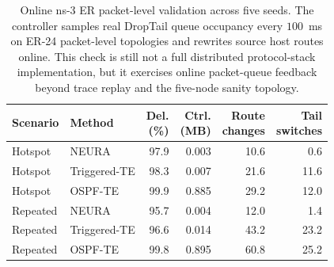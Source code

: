 \begin{table}[t]
\centering
\scriptsize
\caption{Online ns-3 ER packet-level validation across five seeds. The controller samples real DropTail queue occupancy every $100$~ms on ER-24 packet-level topologies and rewrites source host routes online. This check is still not a full distributed protocol-stack implementation, but it exercises online packet-queue feedback beyond trace replay and the five-node sanity topology.}
\label{tab:ns3-online-er}
\setlength{\tabcolsep}{3.5pt}
\renewcommand{\arraystretch}{1.05}
\begin{tabular*}{\columnwidth}{@{\extracolsep{\fill}}llrrrr@{}}
\toprule
Scenario & Method & \shortstack[c]{Del.\\(\%)} & \shortstack[c]{Ctrl.\\(MB)} & \shortstack[c]{Route\\changes} & \shortstack[c]{Tail\\switches} \\
\midrule
Hotspot & NEURA & 97.9 & 0.003 & 10.6 & 0.6 \\
Hotspot & Triggered-TE & 98.3 & 0.007 & 21.6 & 11.6 \\
Hotspot & OSPF-TE & 99.9 & 0.885 & 29.2 & 12.0 \\
\midrule
Repeated & NEURA & 95.7 & 0.004 & 12.0 & 1.4 \\
Repeated & Triggered-TE & 96.6 & 0.014 & 43.2 & 23.2 \\
Repeated & OSPF-TE & 99.8 & 0.895 & 60.8 & 25.2 \\
\bottomrule
\end{tabular*}
\end{table}
